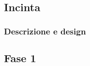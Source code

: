 \subsection{Incinta}
    
    \subsubsection{Descrizione e design}
        
        
    \subsection{Fase 1}
